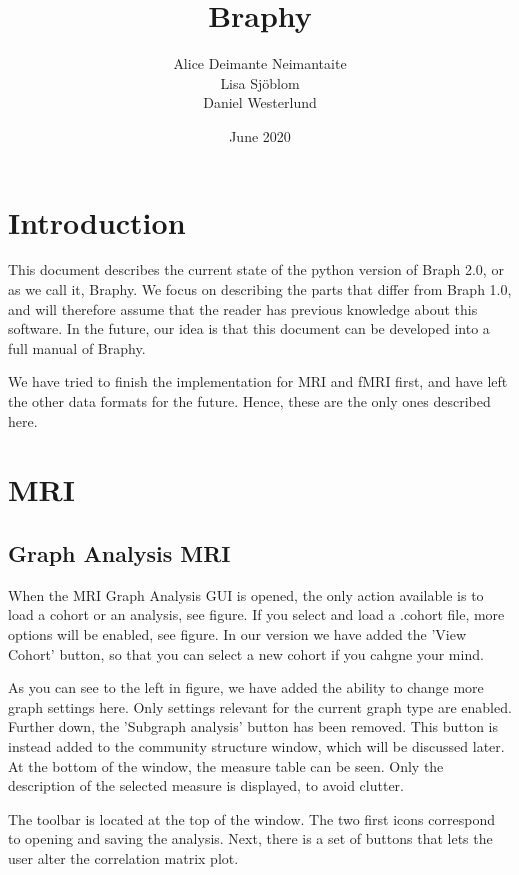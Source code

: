 \documentclass{article}
\title{Braphy}
\author{Alice Deimante Neimantaite \\ Lisa Sjöblom \\ Daniel Westerlund}
\date{June 2020}
\begin{document}
\maketitle

\clearpage

\section{Introduction}

This document describes the current state of the python version of Braph 2.0, or as we call it, Braphy. We focus on describing the parts that differ from Braph 1.0, and will therefore assume that the reader has previous knowledge about this software. In the future, our idea is that this document can be developed into a full manual of Braphy.

We have tried to finish the implementation for MRI and fMRI first, and have left the other data formats for the future. Hence, these are the only ones described here.


\section{MRI}

\subsection{Graph Analysis MRI}

When the MRI Graph Analysis GUI is opened, the only action available is to load a cohort or an analysis, see figure. If you select and load a .cohort file, more options will be enabled, see figure. In our version we have added the 'View Cohort' button, so that you can select a new cohort if you cahgne your mind.

As you can see to the left in figure, we have added the ability to change more graph settings here. Only settings relevant for the current graph type are enabled. Further down, the 'Subgraph analysis' button has been removed. This button is instead added to the community structure window, which will be discussed later. At the bottom of the window, the measure table can be seen. Only the description of the selected measure is displayed, to avoid clutter. 

The toolbar is located at the top of the window. The two first icons correspond to opening and saving the analysis. Next, there is a set of buttons that lets the user alter the correlation matrix plot. 
\end{document}
